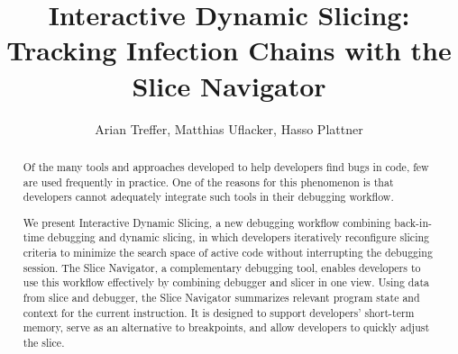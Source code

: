 \documentclass[
			english,
			]{elsarticle}
\begin{document}
\begin{frontmatter}

\title{Interactive Dynamic Slicing: Tracking Infection Chains with the Slice Navigator}

\author{Arian Treffer, Matthias Uflacker, Hasso Plattner}
\address{Hasso Plattner Institute, Potsdam, Germany}


\begin{abstract}
%
%
Of the many tools and approaches developed to help developers find bugs in code, few are used frequently in practice.
One of the reasons for this phenomenon is that developers cannot adequately integrate such tools in their debugging workflow.

We present Interactive Dynamic Slicing, a new debugging workflow combining back-in-time debugging and dynamic slicing, in which developers iteratively reconfigure slicing criteria to minimize the search space of active code without interrupting the debugging session.
The Slice Navigator, a complementary debugging tool, enables developers to use this workflow effectively by combining debugger and slicer in one view.
Using data from slice and debugger, the Slice Navigator summarizes relevant program state and context for the current instruction.
It is designed to support developers’ short-term memory, serve as an alternative to breakpoints, and allow developers to quickly adjust the slice.


\end{abstract}
\end{frontmatter}
\end{document}
